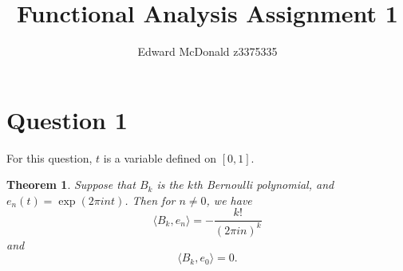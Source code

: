 \documentclass[10pt]{article}
\title{Functional Analysis Assignment 1}
\author{Edward McDonald z3375335}
\date{}
\newtheorem{theorem}{Theorem}
\begin{document}
    \maketitle{}
    \section*{Question 1}
    For this question, $t$ is a variable defined on $[0,1]$.
    \begin{theorem}
        Suppose that $B_k$ is the $k$th Bernoulli polynomial,
        and $e_n(t) = \exp(2\pi i n t)$. Then for $n \neq 0$, we have
        \begin{equation*}
            \langle B_k,e_n\rangle = -\frac{k!}{(2\pi i n)^k}
        \end{equation*}
        and
        \begin{equation*}
            \langle B_k,e_0\rangle = 0.
        \end{equation*}
    \end{theorem}
\end{document}
